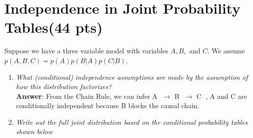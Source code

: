 \documentclass[fleqn]{hw6}
\begin{document}
\section{Independence in Joint Probability Tables(44 pts)}
Suppose we have a three variable model with variables \(A, B,\) and \(C\). We assume \(p(A, B, C) = p(A)p(B | A)p(C | B)\).
\begin{enumerate}
\item \textit{What (conditional) independence assumptions are made by the assumption of how this distribution factorizes?}\\
\textbf{Answer}: From the Chain Rule, we can infer {\Large \textcircled{\normalsize A}} $ \rightarrow $ {\Large \textcircled{\normalsize B}} $ \rightarrow $ 
{\Large \textcircled{\normalsize C}} , A and C are conditionally independent because B blocks the causal chain. \\

\item \textit{Write out the full joint distribution based on the conditional probability tables shown below}
\end{enumerate}
\end{document}
